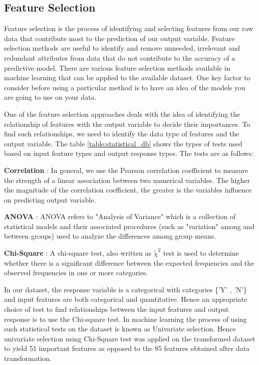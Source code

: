 \documentclass[11pt,openright]{report}
\begin{document}
\subsection {Feature Selection}
Feature selection is the process of identifying and selecting features from our raw data that contribute most to the prediction of our output variable. Feature selection methods are useful to identify and remove unneeded, irrelevant and redundant attributes from data that do not contribute to the accuracy of a predictive model. There are various feature selection methods available in machine learning that can be applied to the available dataset. One key factor to consider before using a particular method is to have an idea of the models you are going to use on your data. 

One of the feature selection approaches deals with the idea of identifying the relationship of features with the output variable to decide their importances. To find such relationships, we need to identify the data type of features and the output variable. The table \ref{table:statistical_db} shows the types of tests used based on input feature types and output response types. The tests are as follows: 

\noindent \textbf{Correlation} : In general, we use the Pearson correlation coefficient to measure the strength of a linear association between two numerical variables. The higher the magnitude of the correlation coefficient, the greater is the variables influence on predicting output variable.

\noindent \textbf{ANOVA} : ANOVA refers to "Analysis of Variance" which is a collection of statistical models and their associated procedures (such as "variation" among and between groups) used to analyze the differences among group means.

\noindent \textbf{Chi-Square} : A chi-square test, also written as $\tilde{\chi}^2$ test is used to determine whether there is a significant difference between the expected frequencies and the observed frequencies in one or more categories.

In our dataset, the response variable is a categorical with categories \{'Y' , 'N'\} and input features are both categorical and quantitative. Hence an appropriate choice of test to find relationships between the input features and output response is to use the Chi-square test. In machine learning the process of using such statistical tests on the dataset is known as Univariate selection. Hence univariate selection using Chi-Square test was applied on the transformed dataset to yield 51 important features as opposed to the 85 features obtained after data transformation.
\end{document}
